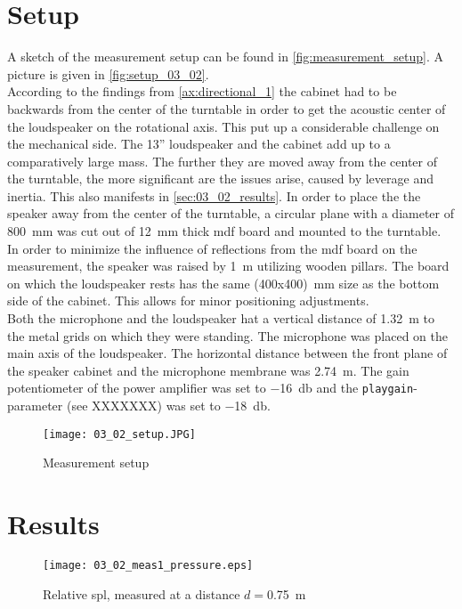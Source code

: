 \section*{Setup}
A sketch of the measurement setup can be found in \autoref{fig:measurement_setup}. A picture is given in \autoref{fig:setup_03_02}. \\
According to the findings from \autoref{ax:directional_1} the cabinet had to be backwards from the center of the turntable in order to get the acoustic center of the loudspeaker on the rotational axis. This put up a considerable challenge on the mechanical side.
The 13'' loudspeaker and the cabinet add up to a comparatively large mass. The further they are moved away from the center of the turntable, the more significant are the issues arise, caused by leverage and inertia. This also manifests in \autoref{sec:03_02_results}.
In order to place the the speaker away from the center of the turntable, a circular plane with a diameter of \SI{800}{\milli\meter} was cut out of \SI{12}{\milli\meter} thick \gls{mdf} board and mounted to the turntable. In order to minimize the influence of reflections from the \gls{mdf} board on the measurement, the speaker was raised by \SI{1}{\meter} utilizing wooden pillars. The board on which the loudspeaker rests has the same (400x400)\SI{}{\milli\meter} size as the bottom side of the cabinet. This allows for minor positioning adjustments.\\
Both the microphone and the loudspeaker hat a vertical distance of \SI{1.32}{\meter} to the metal grids on which they were standing. The microphone was placed on the main axis of the loudspeaker. The horizontal distance between the front plane of the speaker cabinet and the microphone membrane was \SI{2.74}{\meter}.
The gain potentiometer of the power amplifier was set to \SI{-16}{\decibel} and the \texttt{playgain}-parameter (see XXXXXXX) was set to \SI{-18}{\decibel}.

\begin{figure}[htbp]
	\centering
	\texttt{[image: 03\_02\_setup.JPG]}
	\caption{Measurement setup}
		\label{fig:setup_03_02}
\end{figure}

\section*{Results}\label{sec:03_02_results}

\begin{figure}[htbp]
	\centering
	\texttt{[image: 03\_02\_meas1\_pressure.eps]}
	\caption{Relative \gls{spl}, measured at a distance \(d=\)\SI{0.75}{\meter}}
		\label{fig:02_23_m1_pressure}
\end{figure}

